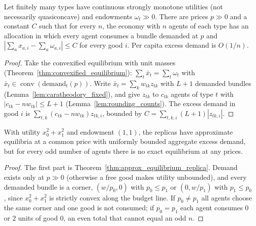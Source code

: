 \begin{theorem}
\label{thm:approx_equilibrium_replica}
\leanok
{}
Let finitely many types have continuous strongly monotone utilities (not necessarily quasiconcave) and endowments
$\omega_t \gg 0$. There are prices $p \gg 0$ and a constant $C$ such that for every $n$, the economy with $n$ agents of
each type has an allocation in which every agent consumes a bundle demanded at $p$ and
$|\sum_a x_{a,i} - \sum_a \omega_{a,i}| \le C$ for every good $i$. Per capita excess demand is $O(1/n)$.
\end{theorem}
\begin{proof}
\leanok
Take the convexified equilibrium with unit masses (Theorem~\ref{thm:convexified_equilibrium}): $\sum_t \bar x_t =
\sum_t \omega_t$ with $\bar x_t \in \operatorname{conv}(\text{demand}_t(p))$. Write $\bar x_t = \sum_k w_{tk} z_{tk}$ with
$L + 1$ demanded bundles (Lemma~\ref{lem:caratheodory_fixed}), and give $z_{tk}$ to $c_{tk}$ agents of type $t$ with
$|c_{tk} - n w_{tk}| \le L + 1$ (Lemma~\ref{lem:rounding_counts}). The excess demand in good $i$ is
$\sum_{t,k} (c_{tk} - n w_{tk}) z_{tk,i}$, bounded by $C = \sum_{t,k,i} (L+1)|z_{tk,i}|$.
\end{proof}

\begin{theorem}
\label{thm:approx_equilibrium_witness}
\leanok
{}
With utility $x_0^2 + x_1^2$ and endowment $(1,1)$, the replicas have approximate equilibria at a common price with
uniformly bounded aggregate excess demand, but for every odd number of agents there is no exact equilibrium at any
prices.
\end{theorem}
\begin{proof}
\leanok
The first part is Theorem~\ref{thm:approx_equilibrium_replica}. Demand exists only at $p \gg 0$ (otherwise a free good
makes utility unbounded), and every demanded bundle is a corner, $(w/p_0, 0)$ with $p_0 \le p_1$ or $(0, w/p_1)$ with
$p_1 \le p_0$, since $x_0^2 + x_1^2$ is strictly convex along the budget line. If $p_0 \ne p_1$ all agents choose the
same corner and one good is not consumed; if $p_0 = p_1$ each agent consumes $0$ or $2$ units of good $0$, an even total
that cannot equal an odd $n$.
\end{proof}

